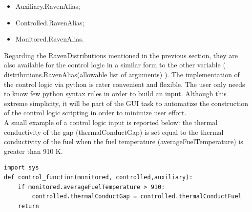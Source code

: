 \documentclass{mc2013}
\begin{document}
\begin{itemize}
  \item Auxiliary.RavenAlias;
  \item Controlled.RavenAlias;
  \item Monitored.RavenAlias.
\end{itemize}
Regarding the RavenDistributions mentioned in the previous section, they are also available for the control logic in a similar form to the other variable ( distributions.RavenAlias(allowable list of arguments) ).
The implementation of the control logic via python is rater convenient and flexible. The user only needs to know few python syntax rules in order to build an input. Although this extreme simplicity, it will be part of the GUI task to automatize the construction of the control logic scripting in order to minimize user effort. 
\\ A small example of a control logic input is reported below:
the thermal conductivity of the gap (thermalConductGap) is set equal to the thermal conductivity of the fuel when the fuel temperature (averageFuelTemperature) is greater than 910 K.
\lstset{
   language=Python,
   showstringspaces=false,
   formfeed=\newpage,
   tabsize=4,
   commentstyle=\itshape
}
\begin{lstlisting}
import sys
def control_function(monitored, controlled,auxiliary):
    if monitored.averageFuelTemperature > 910:
        controlled.thermalConductGap = controlled.thermalConductFuel
    return 
\end{lstlisting}




\end{document}
